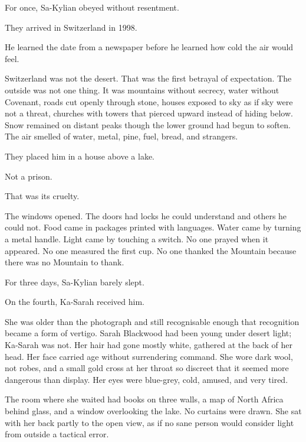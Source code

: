 For once, Sa-Kylian obeyed without resentment.\par

They arrived in Switzerland in 1998.\par

He learned the date from a newspaper before he learned how cold the air would feel.\par

Switzerland was not the desert. That was the first betrayal of expectation. The outside was not one thing. It was mountains without secrecy, water without Covenant, roads cut openly through stone, houses exposed to sky as if sky were not a threat, churches with towers that pierced upward instead of hiding below. Snow remained on distant peaks though the lower ground had begun to soften. The air smelled of water, metal, pine, fuel, bread, and strangers.\par

They placed him in a house above a lake.\par

Not a prison.\par

That was its cruelty.\par

The windows opened. The doors had locks he could understand and others he could not. Food came in packages printed with languages. Water came by turning a metal handle. Light came by touching a switch. No one prayed when it appeared. No one measured the first cup. No one thanked the Mountain because there was no Mountain to thank.\par

For three days, Sa-Kylian barely slept.\par

On the fourth, Ka-Sarah received him.\par

She was older than the photograph and still recognisable enough that recognition became a form of vertigo. Sarah Blackwood had been young under desert light; Ka-Sarah was not. Her hair had gone mostly white, gathered at the back of her head. Her face carried age without surrendering command. She wore dark wool, not robes, and a small gold cross at her throat so discreet that it seemed more dangerous than display. Her eyes were blue-grey, cold, amused, and very tired.\par

The room where she waited had books on three walls, a map of North Africa behind glass, and a window overlooking the lake. No curtains were drawn. She sat with her back partly to the open view, as if no sane person would consider light from outside a tactical error.\par


